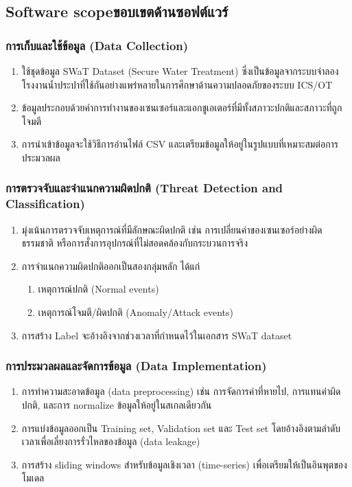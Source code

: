 \subsection{\ifenglish Software scope\else ขอบเขตด้านซอฟต์แวร์\fi}

\subsubsection{การเก็บและใช้ข้อมูล (Data Collection)}
\begin{enumerate}
    \item ใช้ชุดข้อมูล SWaT Dataset (Secure Water Treatment) ซึ่งเป็นข้อมูลจากระบบจำลองโรงงานน้ำประปาที่ใช้กันอย่างแพร่หลายในการศึกษาด้านความปลอดภัยของระบบ ICS/OT
    \item ข้อมูลประกอบด้วยค่าการทำงานของเซนเซอร์และแอกชูเอเตอร์ที่มีทั้งสภาวะปกติและสภาวะที่ถูกโจมตี
    \item การนำเข้าข้อมูลจะใช้วิธีการอ่านไฟล์ CSV และเตรียมข้อมูลให้อยู่ในรูปแบบที่เหมาะสมต่อการประมวลผล
\end{enumerate}

\subsubsection{การตรวจจับและจำแนกความผิดปกติ (Threat Detection and Classification) }
\begin{enumerate}
    \item มุ่งเน้นการตรวจจับเหตุการณ์ที่มีลักษณะผิดปกติ เช่น การเปลี่ยนค่าของเซนเซอร์อย่างผิดธรรมชาติ หรือการสั่งการอุปกรณ์ที่ไม่สอดคล้องกับกระบวนการจริง
    \item การจำแนกความผิดปกติออกเป็นสองกลุ่มหลัก ได้แก่
    \begin{enumerate}
        \item เหตุการณ์ปกติ (Normal events)
        \item เหตุการณ์โจมตี/ผิดปกติ (Anomaly/Attack events)
    \end{enumerate}
    \item การสร้าง Label จะอ้างอิงจากช่วงเวลาที่กำหนดไว้ในเอกสาร SWaT dataset
\end{enumerate}

\subsubsection{การประมวลผลและจัดการข้อมูล (Data Implementation)}
\begin{enumerate}
    \item การทำความสะอาดข้อมูล (data preprocessing) เช่น การจัดการค่าที่หายไป, การแทนค่าผิดปกติ, และการ normalize ข้อมูลให้อยู่ในสเกลเดียวกัน
    \item การแบ่งข้อมูลออกเป็น Training set, Validation set และ Test set โดยอ้างอิงตามลำดับเวลาเพื่อเลี่ยงการรั่วไหลของข้อมูล (data leakage)
    \item การสร้าง sliding windows สำหรับข้อมูลเชิงเวลา (time-series) เพื่อเตรียมให้เป็นอินพุตของโมเดล
\end{enumerate}


